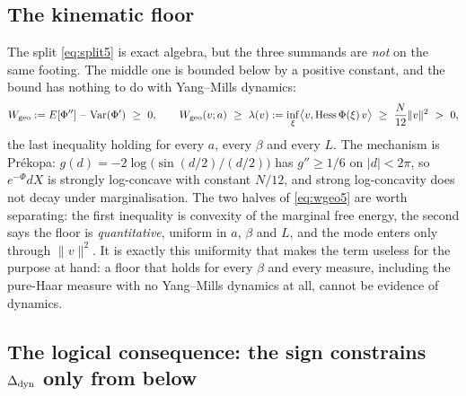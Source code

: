 
\subsection{The kinematic floor}

The split \eqref{eq:split5} is exact algebra, but the three summands are \emph{not} on the same
footing. The middle one is bounded below by a positive constant, and the bound has nothing to do
with Yang--Mills dynamics:
\begin{equation}
W_{\mathrm{geo}}:=E[\Phi'']-\operatorname{Var}(\Phi')\ \ge\ 0,
\qquad
W_{\mathrm{geo}}(v;a)\ \ge\ \lambda(v):=\inf_\xi\bigl\langle v,\operatorname{Hess}\Phi(\xi)\,v\bigr\rangle
\ \ge\ \frac{N}{12}\|v\|^{2}\ >\ 0 ,
\label{eq:wgeo5}
\end{equation}
the last inequality holding for every $a$, every $\beta$ and every $L$.
The mechanism is Pr\'ekopa: $g(d)=-2\log\bigl(\sin(d/2)/(d/2)\bigr)$ has $g''\ge1/6$ on $|d|<2\pi$,
so $e^{-\Phi}dX$ is strongly log-concave with constant $N/12$, and strong log-concavity does not
decay under marginalisation. \LT{} The two halves of \eqref{eq:wgeo5} are worth separating: the
first inequality is convexity of the marginal free energy, the second says the floor is
\emph{quantitative}, uniform in $a$, $\beta$ and $L$, and the mode enters only through
$\|v\|^2$. \LT{} It is exactly this uniformity that makes the term useless for the purpose at
hand: a floor that holds for every $\beta$ and every measure, including the pure-Haar measure with
no Yang--Mills dynamics at all, cannot be evidence of dynamics.


\subsection{The logical consequence: the sign constrains $\Delta_{\mathrm{dyn}}$ only from below}

